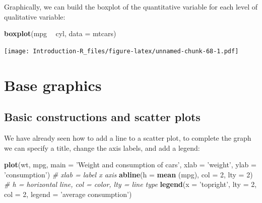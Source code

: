 \documentclass[]{book}
\newenvironment{Shaded}{\begin{snugshade}}{\end{snugshade}}
\newcommand{\CommentTok}[1]{\textcolor[rgb]{0.56,0.35,0.01}{\textit{#1}}}
\newcommand{\DataTypeTok}[1]{\textcolor[rgb]{0.13,0.29,0.53}{#1}}
\newcommand{\DecValTok}[1]{\textcolor[rgb]{0.00,0.00,0.81}{#1}}
\newcommand{\KeywordTok}[1]{\textcolor[rgb]{0.13,0.29,0.53}{\textbf{#1}}}
\newcommand{\NormalTok}[1]{#1}
\newcommand{\OperatorTok}[1]{\textcolor[rgb]{0.81,0.36,0.00}{\textbf{#1}}}
\newcommand{\StringTok}[1]{\textcolor[rgb]{0.31,0.60,0.02}{#1}}
\begin{document}
\begin{Shaded}
\end{Shaded}

Graphically, we can build the boxplot of the quantitative variable for each level of qualitative variable:

\begin{Shaded}
\begin{Highlighting}[]
\KeywordTok{boxplot}\NormalTok{(mpg }\OperatorTok{~}\StringTok{ }\NormalTok{cyl, }\DataTypeTok{data =}\NormalTok{ mtcars)}
\end{Highlighting}
\end{Shaded}

\texttt{[image: Introduction-R\_files/figure-latex/unnamed-chunk-68-1.pdf]}

\hypertarget{base-graphics}{%
\chapter{Base graphics}\label{base-graphics}}

\hypertarget{basic-constructions-and-scatter-plots}{%
\section{Basic constructions and scatter plots}\label{basic-constructions-and-scatter-plots}}

We have already seen how to add a line to a scatter plot, to complete the graph we can specify a title, change the axis labels, and add a legend:

\begin{Shaded}
\begin{Highlighting}[]
\KeywordTok{plot}\NormalTok{(wt, mpg,}
     \DataTypeTok{main =} \StringTok{'Weight and consumption of cars'}\NormalTok{,}
     \DataTypeTok{xlab =} \StringTok{'weight'}\NormalTok{, }\DataTypeTok{ylab =} \StringTok{'consumption'}\NormalTok{) }\CommentTok{# xlab = label x axis}
\KeywordTok{abline}\NormalTok{(}\DataTypeTok{h =} \KeywordTok{mean}\NormalTok{ (mpg), }\DataTypeTok{col =} \DecValTok{2}\NormalTok{, }\DataTypeTok{lty =} \DecValTok{2}\NormalTok{) }\CommentTok{# h = horizontal line, col = color, lty = line type}
\KeywordTok{legend}\NormalTok{(}\DataTypeTok{x =} \StringTok{'topright'}\NormalTok{, }\DataTypeTok{lty =} \DecValTok{2}\NormalTok{, }\DataTypeTok{col =} \DecValTok{2}\NormalTok{, }\DataTypeTok{legend =} \StringTok{'average consumption'}\NormalTok{)}
\end{Highlighting}
\end{Shaded}
\end{document}
